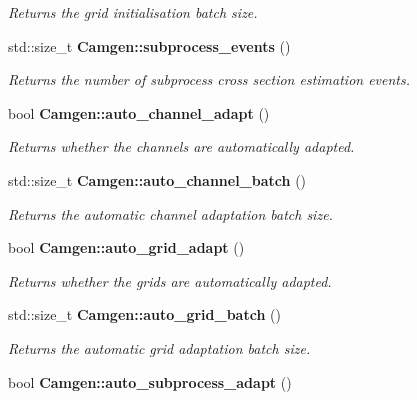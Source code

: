 \begin{DoxyCompactItemize}
\begin{DoxyCompactList}\small\item\em Returns the grid initialisation batch size. \end{DoxyCompactList}\item 
\hypertarget{a00878_a48a6b3d1e3a94e622d75fc2f4c204630}{}std\+::size\+\_\+t {\bfseries Camgen\+::subprocess\+\_\+events} ()\label{a00878_a48a6b3d1e3a94e622d75fc2f4c204630}

\begin{DoxyCompactList}\small\item\em Returns the number of subprocess cross section estimation events. \end{DoxyCompactList}\item 
\hypertarget{a00878_a040576ccd9f56a46334e4cfd8a5b554e}{}bool {\bfseries Camgen\+::auto\+\_\+channel\+\_\+adapt} ()\label{a00878_a040576ccd9f56a46334e4cfd8a5b554e}

\begin{DoxyCompactList}\small\item\em Returns whether the channels are automatically adapted. \end{DoxyCompactList}\item 
\hypertarget{a00878_af557e259212f3212ab4c60a08625216b}{}std\+::size\+\_\+t {\bfseries Camgen\+::auto\+\_\+channel\+\_\+batch} ()\label{a00878_af557e259212f3212ab4c60a08625216b}

\begin{DoxyCompactList}\small\item\em Returns the automatic channel adaptation batch size. \end{DoxyCompactList}\item 
\hypertarget{a00878_a3c970a0eee330bf5a512083b715fe4b0}{}bool {\bfseries Camgen\+::auto\+\_\+grid\+\_\+adapt} ()\label{a00878_a3c970a0eee330bf5a512083b715fe4b0}

\begin{DoxyCompactList}\small\item\em Returns whether the grids are automatically adapted. \end{DoxyCompactList}\item 
\hypertarget{a00878_a0152cb9afac8cb34a5fb0330472c1344}{}std\+::size\+\_\+t {\bfseries Camgen\+::auto\+\_\+grid\+\_\+batch} ()\label{a00878_a0152cb9afac8cb34a5fb0330472c1344}

\begin{DoxyCompactList}\small\item\em Returns the automatic grid adaptation batch size. \end{DoxyCompactList}\item 
\hypertarget{a00878_a9409b57f8454f3ef5a361867bb2530b3}{}bool {\bfseries Camgen\+::auto\+\_\+subprocess\+\_\+adapt} ()\label{a00878_a9409b57f8454f3ef5a361867bb2530b3}


\end{DoxyCompactItemize}
